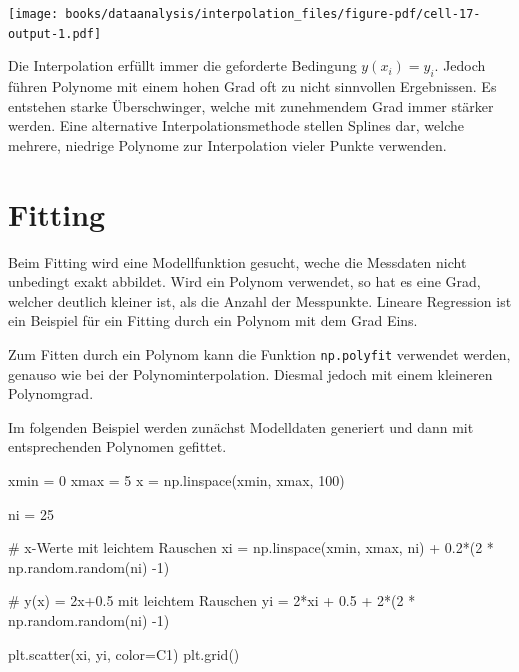 \documentclass[
  letterpaper,
  DIV=11,
  numbers=noendperiod]{scrreprt}
\newenvironment{Shaded}{\begin{snugshade}}{\end{snugshade}}
\newcommand{\CommentTok}[1]{\textcolor[rgb]{0.37,0.37,0.37}{#1}}
\newcommand{\DecValTok}[1]{\textcolor[rgb]{0.68,0.00,0.00}{#1}}
\newcommand{\FloatTok}[1]{\textcolor[rgb]{0.68,0.00,0.00}{#1}}
\newcommand{\NormalTok}[1]{\textcolor[rgb]{0.00,0.23,0.31}{#1}}
\newcommand{\OperatorTok}[1]{\textcolor[rgb]{0.37,0.37,0.37}{#1}}
\newcommand{\StringTok}[1]{\textcolor[rgb]{0.13,0.47,0.30}{#1}}
\begin{document}
\texttt{[image: books/dataanalysis/interpolation\_files/figure-pdf/cell-17-output-1.pdf]}

Die Interpolation erfüllt immer die geforderte Bedingung
\(y(x_i) = y_i\). Jedoch führen Polynome mit einem hohen Grad oft zu
nicht sinnvollen Ergebnissen. Es entstehen starke Überschwinger, welche
mit zunehmendem Grad immer stärker werden. Eine alternative
Interpolationsmethode stellen Splines dar, welche mehrere, niedrige
Polynome zur Interpolation vieler Punkte verwenden.

\chapter{Fitting}\label{fitting}

Beim Fitting wird eine Modellfunktion gesucht, weche die Messdaten nicht
unbedingt exakt abbildet. Wird ein Polynom verwendet, so hat es eine
Grad, welcher deutlich kleiner ist, als die Anzahl der Messpunkte.
Lineare Regression ist ein Beispiel für ein Fitting durch ein Polynom
mit dem Grad Eins.

Zum Fitten durch ein Polynom kann die Funktion \texttt{np.polyfit}
verwendet werden, genauso wie bei der Polynominterpolation. Diesmal
jedoch mit einem kleineren Polynomgrad.

Im folgenden Beispiel werden zunächst Modelldaten generiert und dann mit
entsprechenden Polynomen gefittet.

\begin{Shaded}
\begin{Highlighting}[]
\NormalTok{xmin }\OperatorTok{=} \DecValTok{0}
\NormalTok{xmax }\OperatorTok{=} \DecValTok{5}
\NormalTok{x }\OperatorTok{=}\NormalTok{ np.linspace(xmin, xmax, }\DecValTok{100}\NormalTok{)}

\NormalTok{ni }\OperatorTok{=} \DecValTok{25}

\CommentTok{\# x{-}Werte mit leichtem Rauschen}
\NormalTok{xi }\OperatorTok{=}\NormalTok{ np.linspace(xmin, xmax, ni) }\OperatorTok{+} \FloatTok{0.2}\OperatorTok{*}\NormalTok{(}\DecValTok{2} \OperatorTok{*}\NormalTok{ np.random.random(ni) }\OperatorTok{{-}}\DecValTok{1}\NormalTok{)}

\CommentTok{\# y(x) = 2x+0.5 mit leichtem Rauschen}
\NormalTok{yi }\OperatorTok{=} \DecValTok{2}\OperatorTok{*}\NormalTok{xi }\OperatorTok{+} \FloatTok{0.5} \OperatorTok{+} \DecValTok{2}\OperatorTok{*}\NormalTok{(}\DecValTok{2} \OperatorTok{*}\NormalTok{ np.random.random(ni) }\OperatorTok{{-}}\DecValTok{1}\NormalTok{)}

\NormalTok{plt.scatter(xi, yi, color}\OperatorTok{=}\StringTok{\textquotesingle{}C1\textquotesingle{}}\NormalTok{)}
\NormalTok{plt.grid()}
\end{Highlighting}
\end{Shaded}
\end{document}
